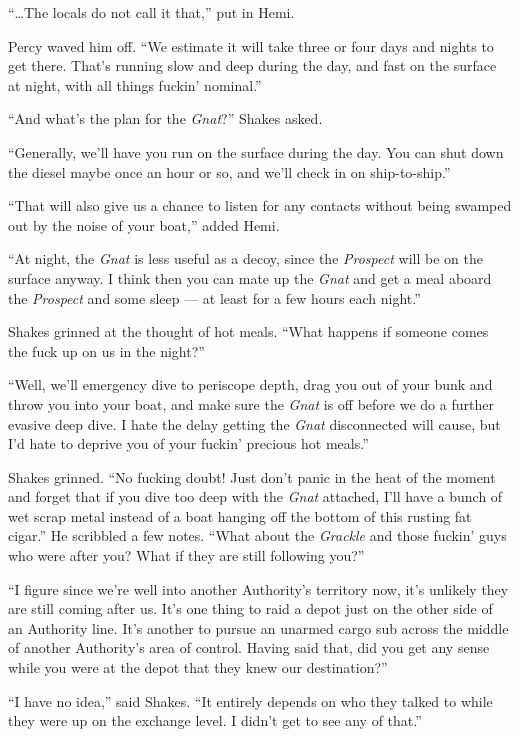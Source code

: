 \documentclass[
]{scrbook}
\begin{document}
``\ldots The locals do not call it that,'' put in Hemi.

Percy waved him off. ``We estimate it will take three or four days and
nights to get there. That's running slow and deep during the day, and
fast on the surface at night, with all things fuckin' nominal.''

``And what's the plan for the \emph{Gnat}?'' Shakes asked.

``Generally, we'll have you run on the surface during the day. You can
shut down the diesel maybe once an hour or so, and we'll check in on
ship-to-ship.''

``That will also give us a chance to listen for any contacts without
being swamped out by the noise of your boat,'' added Hemi.

``At night, the \emph{Gnat} is less useful as a decoy, since the
\emph{Prospect} will be on the surface anyway. I think then you can mate
up the \emph{Gnat} and get a meal aboard the \emph{Prospect} and some
sleep --- at least for a few hours each night.''

Shakes grinned at the thought of hot meals. ``What happens if someone
comes the fuck up on us in the night?''

``Well, we'll emergency dive to periscope depth, drag you out of your
bunk and throw you into your boat, and make sure the \emph{Gnat} is off
before we do a further evasive deep dive. I hate the delay getting the
\emph{Gnat} disconnected will cause, but I'd hate to deprive you of your
fuckin' precious hot meals.''

Shakes grinned. ``No fucking doubt! Just don't panic in the heat of the
moment and forget that if you dive too deep with the \emph{Gnat}
attached, I'll have a bunch of wet scrap metal instead of a boat hanging
off the bottom of this rusting fat cigar.'' He scribbled a few notes.
``What about the \emph{Grackle} and those fuckin' guys who were after
you? What if they are still following you?''

``I figure since we're well into another Authority's territory now, it's
unlikely they are still coming after us. It's one thing to raid a depot
just on the other side of an Authority line. It's another to pursue an
unarmed cargo sub across the middle of another Authority's area of
control. Having said that, did you get any sense while you were at the
depot that they knew our destination?''

``I have no idea,'' said Shakes. ``It entirely depends on who they
talked to while they were up on the exchange level. I didn't get to see
any of that.''
\end{document}
